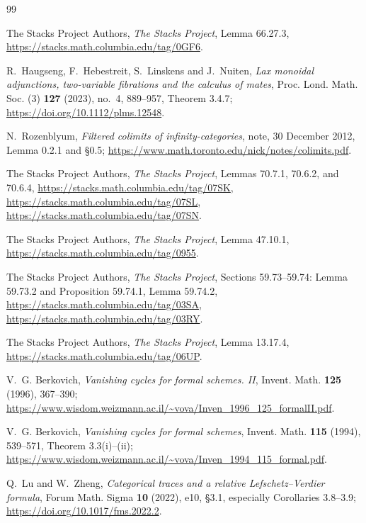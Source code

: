 \documentclass[11pt]{article}
\theoremstyle{definition}
\theoremstyle{remark}
\begin{document}
\begin{thebibliography}{99}

The Stacks Project Authors,
\emph{The Stacks Project}, Lemma 66.27.3,
\url{https://stacks.math.columbia.edu/tag/0GF6}.


R.~Haugseng, F.~Hebestreit, S.~Linskens and J.~Nuiten,
\emph{Lax monoidal adjunctions, two-variable fibrations and the calculus
of mates}, Proc. Lond. Math. Soc. (3) \textbf{127} (2023), no.~4,
889--957, Theorem 3.4.7;
\url{https://doi.org/10.1112/plms.12548}.

N.~Rozenblyum,
\emph{Filtered colimits of infinity-categories}, note, 30 December 2012,
Lemma 0.2.1 and \S0.5;
\url{https://www.math.toronto.edu/nick/notes/colimits.pdf}.

The Stacks Project Authors,
\emph{The Stacks Project}, Lemmas 70.7.1, 70.6.2, and 70.6.4,
\url{https://stacks.math.columbia.edu/tag/07SK},
\url{https://stacks.math.columbia.edu/tag/07SL},
\url{https://stacks.math.columbia.edu/tag/07SN}.


The Stacks Project Authors,
\emph{The Stacks Project}, Lemma 47.10.1,
\url{https://stacks.math.columbia.edu/tag/0955}.


The Stacks Project Authors,
\emph{The Stacks Project}, Sections 59.73--59.74:
Lemma 59.73.2 and Proposition 59.74.1, Lemma 59.74.2,
\url{https://stacks.math.columbia.edu/tag/03SA},
\url{https://stacks.math.columbia.edu/tag/03RY}.

The Stacks Project Authors,
\emph{The Stacks Project}, Lemma 13.17.4,
\url{https://stacks.math.columbia.edu/tag/06UP}.


V.~G. Berkovich,
\emph{Vanishing cycles for formal schemes. II},
Invent. Math. \textbf{125} (1996), 367--390;
\url{https://www.wisdom.weizmann.ac.il/~vova/Inven_1996_125_formalII.pdf}.

V.~G. Berkovich,
\emph{Vanishing cycles for formal schemes},
Invent. Math. \textbf{115} (1994), 539--571,
Theorem 3.3(i)--(ii);
\url{https://www.wisdom.weizmann.ac.il/~vova/Inven_1994_115_formal.pdf}.

Q.~Lu and W.~Zheng,
\emph{Categorical traces and a relative Lefschetz--Verdier formula},
Forum Math. Sigma \textbf{10} (2022), e10,
\S3.1, especially Corollaries 3.8--3.9;
\url{https://doi.org/10.1017/fms.2022.2}.


\end{thebibliography}
\end{document}
